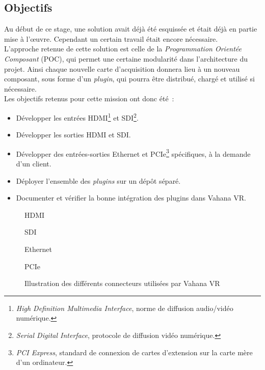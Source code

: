 \subsection{Objectifs}
Au début de ce stage, une solution avait déjà été esquissée et était déjà en partie
mise à l'\oe uvre. Cependant un certain travail était encore nécessaire.\\
L'approche retenue de cette solution est celle de la \emph{Programmation Orientée Composant} (POC),
qui permet une certaine modularité dans l'architecture du projet\cite{poc}. Ainsi chaque nouvelle
carte d'acquisition donnera lieu à un nouveau composant, sous forme d'un \textit{plugin},
qui pourra être distribué, chargé et utilisé si nécessaire\cite{plugin}.\\
\newline
Les objectifs retenus pour cette mission ont donc été~:
\begin{itemize}
  \item Développer les entrées HDMI\footnote{\textit{High Definition Multimedia Interface}, 
  norme de diffusion audio/vidéo numérique\cite{hdmi}.} et SDI\footnote{\textit{Serial Digital Interface}, 
  protocole de diffusion vidéo numérique\cite{sdi}.}.
  \item Développer les sorties HDMI et SDI.
  \item Développer des entrées-sorties Ethernet et PCIe\footnote{\textit{PCI Express}, standard
  de connexion de cartes d'extension sur la carte mère d'un ordinateur\cite{pci-express}.}
  spécifiques, à la demande d'un client.
  \item Déployer l'ensemble des \textit{plugins} sur un dépôt séparé.
  \item Documenter et vérifier la bonne intégration des plugins dans Vahana VR.
\end{itemize}

\begin{figure}
  \centering
  \begin{minipage}[t]{0.2\textwidth}
    \centering
    \caption{HDMI}
  \end{minipage}%
  \hspace{0.03\textwidth}
  \begin{minipage}[t]{0.2\textwidth}
    \centering
    \caption{SDI}
  \end{minipage}%
  \hspace{0.03\textwidth}
  \begin{minipage}[t]{0.2\textwidth}
    \centering
    \caption{Ethernet}
  \end{minipage}%
  \hspace{0.03\textwidth}
  \begin{minipage}[t]{0.2\textwidth}
    \centering
    \caption{PCIe}
  \end{minipage}
  \caption{Illustration des différents connecteurs utilisées par Vahana VR}
\end{figure}


